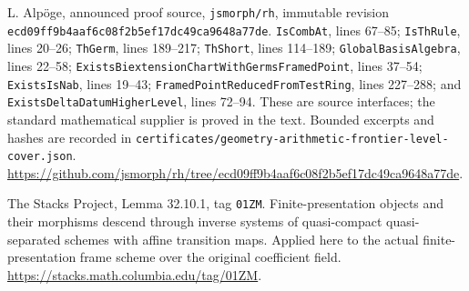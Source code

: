 L. Alp\"oge, announced proof source, \texttt{jsmorph/rh}, immutable
revision \texttt{ecd09ff9b4aaf6c08f2b5ef17dc49ca9648a77de}.
\texttt{IsCombAt}, lines 67--85;
\texttt{IsThRule}, lines 20--26;
\texttt{ThGerm}, lines 189--217;
\texttt{ThShort}, lines 114--189;
\texttt{GlobalBasisAlgebra}, lines 22--58;
\texttt{ExistsBiextensionChartWithGermsFramedPoint}, lines 37--54;
\texttt{ExistsIsNab}, lines 19--43;
\texttt{FramedPointReducedFromTestRing}, lines 227--288; and
\texttt{ExistsDeltaDatumHigherLevel}, lines 72--94.
These are source interfaces; the standard mathematical supplier is
proved in the text.  Bounded excerpts and hashes are recorded in
\texttt{certificates/geometry-arithmetic-frontier-level-cover.json}.
\url{https://github.com/jsmorph/rh/tree/ecd09ff9b4aaf6c08f2b5ef17dc49ca9648a77de}.

The Stacks Project, Lemma 32.10.1, tag \texttt{01ZM}.
Finite-presentation objects and their morphisms descend through
inverse systems of quasi-compact quasi-separated schemes with affine
transition maps.  Applied here to the actual finite-presentation
frame scheme over the original coefficient field.
\url{https://stacks.math.columbia.edu/tag/01ZM}.
